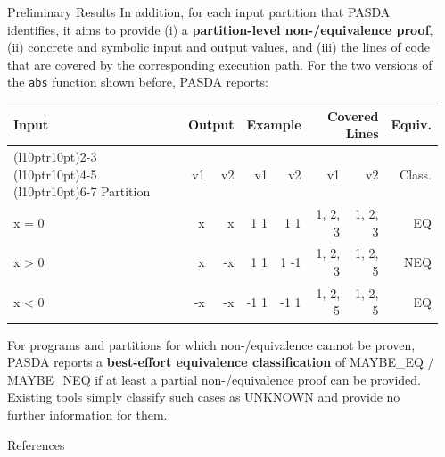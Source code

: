 \documentclass[final,hyperref={pdfpagelabels=false}]{beamer}
\begin{document}
\begin{frame}[t]
\begin{columns}[t]
\begin{column}{.45\textwidth}
\begin{block}{Preliminary Results}
      In addition, for each input partition that PASDA identifies, it aims to provide (i) a \textbf{partition-level non-/equivalence proof}, (ii) concrete and symbolic input and output values, and (iii) the lines of code that are covered by the corresponding execution path. For the two versions of the \texttt{abs} function shown before, PASDA reports:

      \vspace{20pt}
      \begin{table}[]
        \setlength{\tabcolsep}{1ex}
        \begin{tabular}{lrrrrrrr} \toprule
          Input           & \multicolumn{2}{r}{Output} & \multicolumn{2}{r}{Example}                      & \multicolumn{2}{r}{Covered Lines} & Equiv. \\ \cmidrule(l{10pt}r{10pt}){2-3} \cmidrule(l{10pt}r{10pt}){4-5} \cmidrule(l{10pt}r{10pt}){6-7}
          Partition                  & v1     & v2                & v1                     & v2                      & v1            & v2      & Class.               \\ \midrule
          x = 0               &  x     &  x                &  1 \textrightarrow{} 1 &  1 \textrightarrow{}  1 & 1, 2, 3       & 1, 2, 3 & EQ             \\
          x \textgreater{} 0  &  x     & -x                &  1 \textrightarrow{} 1 &  1 \textrightarrow{} -1 & 1, 2, 3       & 1, 2, 5 & NEQ            \\
          x \textless{} 0     & -x     & -x                & -1 \textrightarrow{} 1 & -1 \textrightarrow{}  1 & 1, 2, 5       & 1, 2, 5 & EQ            \\ \bottomrule
        \end{tabular}
      \end{table}
      \vspace{20pt}

      For programs and partitions for which non-/equivalence cannot be proven, PASDA reports a \textbf{best-effort equivalence classification} of MAYBE\_EQ / MAYBE\_NEQ if at least a partial non-/equivalence proof can be provided. Existing tools simply classify such cases as UNKNOWN and provide no further information for them.
    \end{block}

    \begin{block}{References}
      \nocite{*} %
      \linespread{0.928}\selectfont
      \footnotesize{
      }
    \end{block}
  \end{column} %

  \begin{column}{.04\textwidth}\end{column} %

\end{columns} %

\end{frame} %
\end{document}
